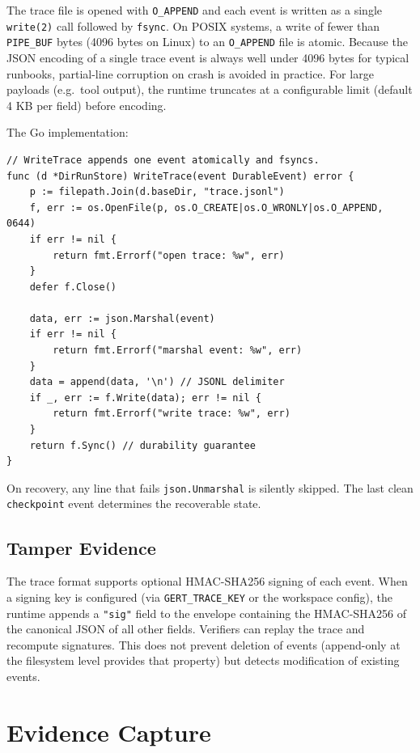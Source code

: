 The trace file is opened with \texttt{O\_APPEND} and each event is written as a single \texttt{write(2)} call followed by \texttt{fsync}. On POSIX systems, a write of fewer than \texttt{PIPE\_BUF} bytes (4096 bytes on Linux) to an \texttt{O\_APPEND} file is atomic. Because the JSON encoding of a single trace event is always well under 4096 bytes for typical runbooks, partial-line corruption on crash is avoided in practice. For large payloads (e.g.\ tool output), the runtime truncates at a configurable limit (default 4 KB per field) before encoding.

The Go implementation:

\begin{verbatim}
// WriteTrace appends one event atomically and fsyncs.
func (d *DirRunStore) WriteTrace(event DurableEvent) error {
    p := filepath.Join(d.baseDir, "trace.jsonl")
    f, err := os.OpenFile(p, os.O_CREATE|os.O_WRONLY|os.O_APPEND, 0644)
    if err != nil {
        return fmt.Errorf("open trace: %w", err)
    }
    defer f.Close()

    data, err := json.Marshal(event)
    if err != nil {
        return fmt.Errorf("marshal event: %w", err)
    }
    data = append(data, '\n') // JSONL delimiter
    if _, err := f.Write(data); err != nil {
        return fmt.Errorf("write trace: %w", err)
    }
    return f.Sync() // durability guarantee
}
\end{verbatim}

On recovery, any line that fails \texttt{json.Unmarshal} is silently skipped. The last clean \texttt{checkpoint} event determines the recoverable state.

\subsection{Tamper Evidence}

The trace format supports optional HMAC-SHA256 signing of each event. When a signing key is configured (via \texttt{GERT\_TRACE\_KEY} or the workspace config), the runtime appends a \texttt{"sig"} field to the envelope containing the HMAC-SHA256 of the canonical JSON of all other fields. Verifiers can replay the trace and recompute signatures. This does not prevent deletion of events (append-only at the filesystem level provides that property) but detects modification of existing events.

\section{Evidence Capture}


